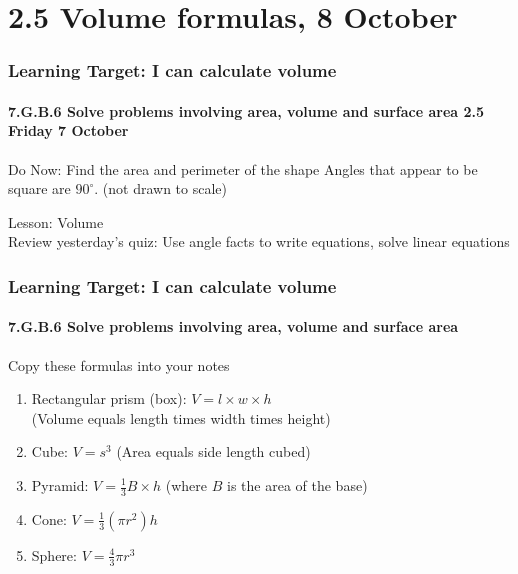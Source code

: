 \documentclass{beamer}
\begin{document}
\section{2.5 Volume formulas, 8 October}
\frame
{
  \frametitle{Learning Target: I can calculate volume}
  \framesubtitle{7.G.B.6 Solve problems involving area, volume and surface area \hfill \alert{2.5 Friday 7 October}}
  \begin{block}{Do Now: Find the area and perimeter of the shape}
    Angles that appear to be square are $90^\circ$. (not drawn to scale)
    \begin{flushleft}
    \end{flushleft}
\end{block}
  Lesson: Volume\\
  Review yesterday's quiz: Use angle facts to write equations, solve linear equations
} 

\frame
{
  \frametitle{Learning Target:  I can calculate volume}
  \framesubtitle{7.G.B.6 Solve problems involving area, volume and surface area}

  \begin{block}{Copy these formulas into your notes}
    
    \begin{enumerate}
    \item Rectangular prism (box): $V=l \times w \times h$ \\(Volume equals length times width times height)
    \item Cube: $V=s^3$ (Area equals side length cubed)
    \item Pyramid: $V=\frac{1}{3} B \times h$ (where $B$ is the area of the base)
    \item Cone: $V=\frac{1}{3} (\pi r^2) h$ 
    \item Sphere: $V=\frac{4}{3}\pi r^3$
    \end{enumerate}
  \end{block}
}
\end{document}
